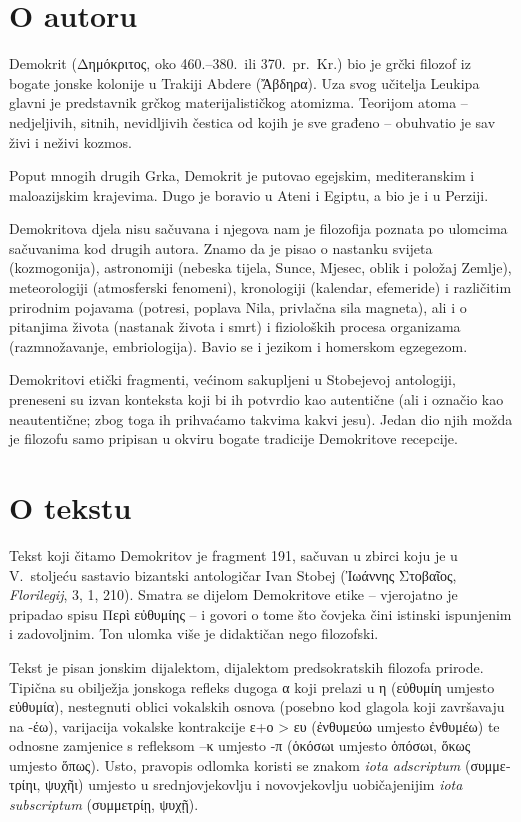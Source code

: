 
\section*{O autoru}

Demokrit (Δημόκριτος, oko 460.–380.\ ili 370.\ pr.~Kr.) bio je grčki filozof iz bogate jonske kolonije u Trakiji Abdere (Ἄβδηρα). Uza svog učitelja Leukipa glavni je predstavnik grčkog materijalističkog atomizma. Teorijom atoma – nedjeljivih, sitnih, nevidljivih čestica od kojih je sve građeno – obuhvatio je sav živi i neživi kozmos.

Poput mnogih drugih Grka, Demokrit je putovao egejskim, mediteranskim i maloazijskim krajevima. Dugo je boravio u Ateni i Egiptu, a bio je i u Perziji.

Demokritova djela nisu sačuvana i njegova nam je filozofija poznata po ulomcima sačuvanima kod drugih autora. Znamo da je pisao o nastanku svijeta (kozmogonija), astronomiji (nebeska tijela, Sunce, Mjesec, oblik i položaj Zemlje), meteorologiji (atmosferski fenomeni), kronologiji (kalendar, efemeride) i različitim prirodnim pojavama (potresi, poplava Nila, privlačna sila magneta), ali i o pitanjima života (nastanak života i smrt) i fizioloških procesa organizama (razmnožavanje, embriologija). Bavio se i jezikom i homerskom egzegezom.

Demokritovi etički fragmenti, većinom sakupljeni u Stobejevoj antologiji, preneseni su izvan konteksta koji bi ih potvrdio kao autentične (ali i označio kao neautentične; zbog toga ih prihvaćamo takvima kakvi jesu). Jedan dio njih možda je filozofu samo pripisan u okviru bogate tradicije Demokritove recepcije.

\section*{O tekstu}

Tekst koji čitamo Demokritov je fragment 191, sačuvan u zbirci koju je u V.~stoljeću sastavio bizantski antologičar Ivan Stobej \textgreek{(Ἰωάννης Στοβαῖος,} \textit{Florilegij}, 3, 1, 210). Smatra se dijelom Demokritove etike – vjerojatno je pripadao spisu Περὶ εὐθυμίης – i govori o tome što čovjeka čini istinski ispunjenim i zadovoljnim. Ton ulomka više je didaktičan nego filozofski.

Tekst je pisan jonskim dijalektom, dijalektom predsokratskih filozofa prirode. Tipična su obilježja jonskoga refleks dugoga α koji prelazi u η \textgreek{(εὐθυμίη} umjesto \textgreek{εὐθυμία),} nestegnuti oblici vokalskih osnova (posebno kod glagola koji završavaju na -έω), varijacija vokalske kontrakcije ε+ο > ευ \textgreek{(ἐνθυμεύω} umjesto \textgreek{ἐνθυμέω)} te odnosne zamjenice s refleksom –κ umjesto -π \textgreek{(ὁκόσωι} umjesto ὁπόσωι, ὅκως umjesto ὅπως). Usto, pravopis odlomka koristi se znakom \textit{iota adscriptum} \textgreek{(συμμετρίηι, ψυχῆι)} umjesto u srednjovjekovlju i novovjekovlju uobičajenijim \textit{iota subscriptum} \textgreek{(συμμετρίῃ, ψυχῇ).}

